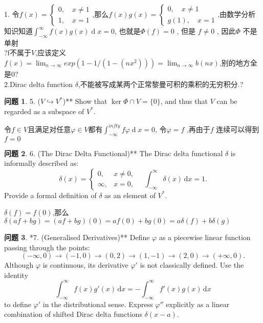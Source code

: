 \documentclass[11pt]{ctexart}
\theoremstyle{definition}
\newtheorem{qqq}{问题}[section]
\numberwithin{equation}{section}
\newcommand{\op}[1]{\operatorname{#1}}%
\theoremstyle{definition}
\theoremstyle{remark}
\begin{document}
\begin{aaa}
    1. 令$f(x)=\begin{cases}
    0,\quad x\neq 1\\
    1,\quad x=1
    \end{cases}$,那么$f(x)g(x)=\begin{cases}
        0,\quad x\neq 1\\
        g(1),\quad x=1
        \end{cases}$,由数学分析知识知道$\int_{-\infty}^{\infty}f(x)g(x)\op{d}x=0$, 也就是$\Phi(f)=0$  , 但是 $f\neq 0$ , 因此$\Phi$ 不是单射\\
        ?f不属于$V$,应该定义$f(x)=\lim_{n\to \infty}exp(1-1/(1-(nx^2)))=\lim_{n\to\infty}b(nx)$,别的地方全是0?\\\[{}\]
    2.Dirac delta function $\delta$,不能被写成某两个正常黎曼可积的乘积的无穷积分.?
\end{aaa}
\begin{qqq}
    5. ($V \hookrightarrow V^\ast$)** Show that $\ker \Phi \cap V = \{0\}$, and thus that $V$ can be regarded as a subspace of $V^\ast$.

\end{qqq}
\begin{aaa}
    令$f\in V$且满足对任意$\varphi\in V$都有$\int_{-\infty}^{infty}f\varphi\op{d}x=0$, 令$\varphi =f$ ,再由于$f$ 连续可以得到$f=0$
\end{aaa}
\begin{qqq}
    6. (The Dirac Delta Functional)** The Dirac delta functional $\delta$ is informally described as:
$$
\delta(x) = 
\begin{cases}
0, & x \neq 0, \\
\infty, & x = 0,
\end{cases} \quad \int_{-\infty}^\infty \delta(x)\, \mathrm{d}x = 1.
$$
Provide a formal definition of $\delta$ as an element of $V^\ast$.
\end{qqq}
\begin{aaa}
    $\delta(f)=f(0)$,那么$\delta(af+bg)=(af+bg)(0)=af(0)+bg(0)=a\delta(f)+b\delta(g)$
\end{aaa}
\begin{qqq}
    *7. (Generalised Derivatives)** Define $\varphi$ as a piecewise linear function passing through the points:
$$
(-\infty, 0) \to (-1,0) \to (0,2) \to (1,-1) \to (2,0) \to (+\infty, 0).
$$
Although $\varphi$ is continuous, its derivative $\varphi'$ is not classically defined. Use the identity
$$
\int_{-\infty}^\infty f(x)g'(x)\, \mathrm{d}x = -\int_{-\infty}^\infty f'(x)g(x)\, \mathrm{d}x
$$
to define $\varphi'$ in the distributional sense. Express $\varphi''$ explicitly as a linear combination of shifted Dirac delta functions $\delta(x-a)$.
\end{qqq}
\end{document}

